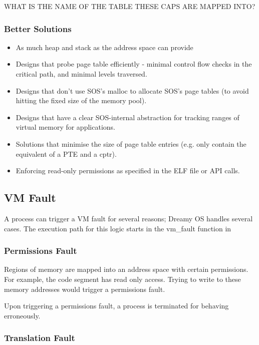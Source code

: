 \documentclass[runningheads,a4paper]{llncs}
\begin{document}
WHAT IS THE NAME OF THE TABLE THESE CAPS ARE MAPPED INTO?

\subsubsection{Better Solutions}

\begin{itemize}[label={\checkmark}]
  \item As much heap and stack as the address space can provide
  \item Designs that probe page table efficiently - minimal control flow checks in the critical path, and minimal levels traversed.
  \item Designs that don't use SOS's malloc to allocate SOS's page tables (to avoid hitting the fixed size of the memory pool).
  \item Designs that have a clear SOS-internal abstraction for tracking ranges of virtual memory for applications.
  \item Solutions that minimise the size of page table entries (e.g. only contain the equivalent of a PTE and a cptr).
  \item  Enforcing read-only permissions as specified in the ELF file or API calls.
\end{itemize}


\subsection{VM Fault}

A process can trigger a VM fault for several reasons; Dreamy OS handles several cases. The execution path for this logic starts in the vm\_fault function in 

\subsubsection{Permissions Fault}

Regions of memory are mapped into an address space with certain permissions. For example, the code segment has read only access. Trying to write to these memory addresses would trigger a permissions fault.

Upon triggering a permissions fault, a process is terminated for behaving erroneously.

\subsubsection{Translation Fault}
\end{document}
